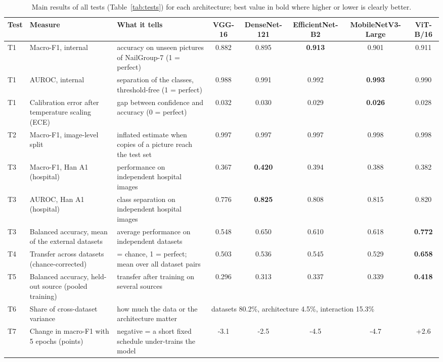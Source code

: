 \begin{table}[!htbp]
\centering
\caption{Main results of all tests (Table~\ref{tab:tests}) for each architecture; best value in bold where higher or lower is clearly better.}
\label{tab:summary}
\footnotesize
\begin{tabular}{>{\raggedright\arraybackslash}p{0.6cm}>{\raggedright\arraybackslash}p{4.0cm}>{\raggedright\arraybackslash}p{4.6cm}ccccc}
\hline
Test & Measure & What it tells & VGG-16 & DenseNet-121 & EfficientNet-B2 & MobileNetV3-Large & ViT-B/16 \\
\hline
T1 & Macro-F1, internal & accuracy on unseen pictures of NailGroup-7 (1 = perfect) & 0.882 & 0.895 & \textbf{0.913} & 0.901 & 0.911 \\
T1 & AUROC, internal & separation of the classes, threshold-free (1 = perfect) & 0.988 & 0.991 & 0.992 & \textbf{0.993} & 0.990 \\
T1 & Calibration error after temperature scaling (ECE) & gap between confidence and accuracy (0 = perfect) & 0.032 & 0.030 & 0.029 & \textbf{0.026} & 0.028 \\
T2 & Macro-F1, image-level split & inflated estimate when copies of a picture reach the test set & 0.997 & 0.997 & 0.997 & 0.998 & 0.998 \\
T3 & Macro-F1, Han A1 (hospital) & performance on independent hospital images & 0.367 & \textbf{0.420} & 0.394 & 0.388 & 0.382 \\
T3 & AUROC, Han A1 (hospital) & class separation on independent hospital images & 0.776 & \textbf{0.825} & 0.808 & 0.815 & 0.820 \\
T3 & Balanced accuracy, mean of the external datasets & average performance on independent datasets & 0.548 & 0.650 & 0.610 & 0.618 & \textbf{0.772} \\
T4 & Transfer across datasets (chance-corrected) & 0 = chance, 1 = perfect; mean over all dataset pairs & 0.503 & 0.536 & 0.545 & 0.529 & \textbf{0.658} \\
T5 & Balanced accuracy, held-out source (pooled training) & transfer after training on several sources & 0.296 & 0.313 & 0.337 & 0.339 & \textbf{0.418} \\
T6 & Share of cross-dataset variance & how much the data or the architecture matter & \multicolumn{5}{l}{datasets 80.2\%, architecture 4.5\%, interaction 15.3\%} \\
T7 & Change in macro-F1 with 5 epochs (points) & negative = a short fixed schedule under-trains the model & -3.1 & -2.5 & -4.5 & -4.7 & +2.6 \\

\end{tabular}
\end{table}
